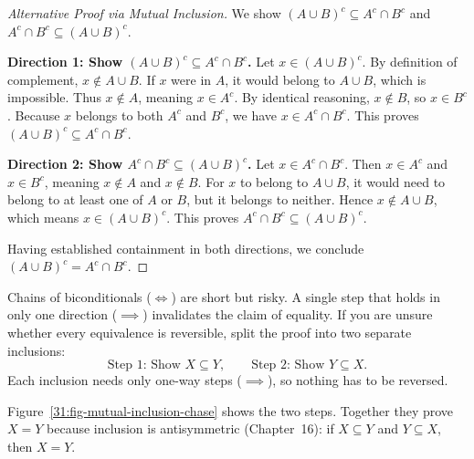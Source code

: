 \begin{proof}[Alternative Proof via Mutual Inclusion]
We show $(A \cup B)^c \subseteq A^c \cap B^c$ and $A^c \cap B^c \subseteq (A \cup B)^c$.

\textbf{Direction 1: Show $(A \cup B)^c \subseteq A^c \cap B^c$.}
Let $x \in (A \cup B)^c$. By definition of complement, $x \notin A \cup B$. If $x$ were in $A$, it would belong to $A \cup B$, which is impossible. Thus $x \notin A$, meaning $x \in A^c$. By identical reasoning, $x \notin B$, so $x \in B^c$. Because $x$ belongs to both $A^c$ and $B^c$, we have $x \in A^c \cap B^c$. This proves $(A \cup B)^c \subseteq A^c \cap B^c$.

\textbf{Direction 2: Show $A^c \cap B^c \subseteq (A \cup B)^c$.}
Let $x \in A^c \cap B^c$. Then $x \in A^c$ and $x \in B^c$, meaning $x \notin A$ and $x \notin B$. For $x$ to belong to $A \cup B$, it would need to belong to at least one of $A$ or $B$, but it belongs to neither. Hence $x \notin A \cup B$, which means $x \in (A \cup B)^c$. This proves $A^c \cap B^c \subseteq (A \cup B)^c$.

Having established containment in both directions, we conclude $(A \cup B)^c = A^c \cap B^c$.
\end{proof}

\begin{trapbox}
Chains of biconditionals ($\iff$) are short but risky. A single step that holds in only one direction ($\implies$) invalidates the claim of equality. If you are unsure whether every equivalence is reversible, split the proof into two separate inclusions:
\[
\text{Step 1: Show } X \subseteq Y, \qquad \text{Step 2: Show } Y \subseteq X.
\]
Each inclusion needs only one-way steps ($\implies$), so nothing has to be reversed.
\end{trapbox}

Figure~\ref{31:fig-mutual-inclusion-chase} shows the two steps. Together they prove $X = Y$ because inclusion is antisymmetric (Chapter~16): if $X \subseteq Y$ and $Y \subseteq X$, then $X = Y$.

